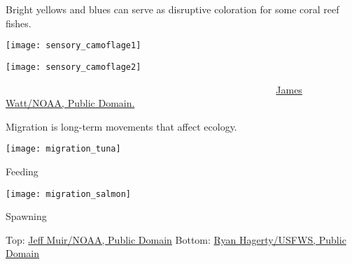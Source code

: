 \documentclass[t]{beamer}
\begin{document}
\begin{frame}[t]{Bright yellows and blues can serve as disruptive coloration for some coral reef fishes.}

\vspace{-\baselineskip}

\begin{multicols}{2}

\texttt{[image: sensory\_camoflage1]}

\columnbreak

\texttt{[image: sensory\_camoflage2]}

\end{multicols}

\end{frame}

%

{
\begin{frame}

\vfill

\tinyfill\textcolor{white}{Holocentriformes: Holocentridae: \textit{Sargocentron xantherythrum,} \href{https://en.wikipedia.org/wiki/File:Red_Fish_at_Papah\%C4\%81naumoku\%C4\%81kea_(cropped).jpg}{James Watt/NOAA, Public Domain.}}

\end{frame}
}

\begin{frame}[t]{Migration is long-term movements that affect ecology.}

\vspace{-\baselineskip}

\begin{multicols}{2}

\texttt{[image: migration\_tuna]}

Feeding

\columnbreak

\texttt{[image: migration\_salmon]}

Spawning




\end{multicols}

\vfilll

\tiny Top: \href{https://www.fisheries.noaa.gov/feature-story/how-we-safeguard-atlantic-tunas}{Jeff Muir/NOAA, Public Domain} \hfill Bottom: \href{https://www.fws.gov/media/coho-and-sockeye-migration-russian-river}{Ryan Hagerty/USFWS, Public Domain}
\end{frame}
\end{document}
